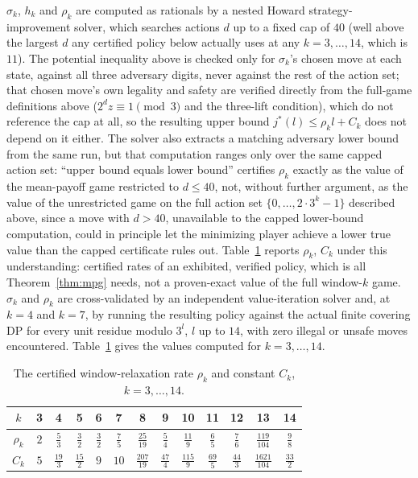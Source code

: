 \documentclass[11pt]{amsart}
\theoremstyle{plain}
\theoremstyle{definition}
\theoremstyle{remark}
\begin{document}
$\sigma_k$, $h_k$ and $\rho_k$ are computed as rationals by a nested Howard strategy-improvement
solver, which searches actions $d$ up to a fixed cap of $40$ (well above the largest $d$ any
certified policy below actually uses at any $k=3,\dots,14$, which is $11$). The potential inequality
above is checked only for $\sigma_k$'s chosen move at each state, against all three adversary digits,
never against the rest of the action set; that chosen move's own legality and safety are verified
directly from the full-game definitions above ($2^dz\equiv1\pmod3$ and the three-lift condition),
which do not reference the cap at all, so the resulting upper bound $j^*(l)\le\rho_kl+C_k$ does not
depend on it either. The solver
also extracts a matching adversary lower bound from the same run, but that computation ranges only
over the same capped action set: ``upper bound equals lower bound'' certifies $\rho_k$ exactly as the
value of the mean-payoff game restricted to $d\le40$, not, without further argument, as the value of
the unrestricted game on the full action set $\{0,\dots,2\cdot3^k-1\}$ described above, since a move
with $d>40$, unavailable to the capped lower-bound computation, could in principle let the
minimizing player achieve a lower true value than the capped certificate rules out. Table~\ref{tab:mpg}
reports $\rho_k$, $C_k$ under this understanding: certified rates of an exhibited, verified policy,
which is all Theorem~\ref{thm:mpg} needs, not a proven-exact value of the full window-$k$ game.
$\sigma_k$ and $\rho_k$ are cross-validated by an independent value-iteration solver and, at $k=4$ and
$k=7$, by running the resulting policy against the actual finite covering DP for every unit residue
modulo $3^l$, $l$ up to $14$, with zero illegal or unsafe moves encountered.
Table~\ref{tab:mpg} gives the values computed for $k=3,\dots,14$.

\begin{table}[h]
\centering
\begin{tabular}{c|c|c|c|c|c|c|c|c|c|c|c|c}
$k$ & 3 & 4 & 5 & 6 & 7 & 8 & 9 & 10 & 11 & 12 & 13 & 14 \\ \hline
$\rho_k$ & $2$ & $\tfrac53$ & $\tfrac32$ & $\tfrac32$ & $\tfrac75$ & $\tfrac{25}{19}$ & $\tfrac54$ &
$\tfrac{11}{9}$ & $\tfrac65$ & $\tfrac76$ & $\tfrac{119}{104}$ & $\tfrac98$ \\ \hline
$C_k$ & $5$ & $\tfrac{19}{3}$ & $\tfrac{15}{2}$ & $9$ & $10$ & $\tfrac{207}{19}$ & $\tfrac{47}{4}$ &
$\tfrac{115}{9}$ & $\tfrac{69}{5}$ & $\tfrac{44}{3}$ & $\tfrac{1621}{104}$ & $\tfrac{33}{2}$
\end{tabular}
\caption{The certified window-relaxation rate $\rho_k$ and constant $C_k$, $k=3,\dots,14$.}
\label{tab:mpg}
\end{table}
\end{document}
